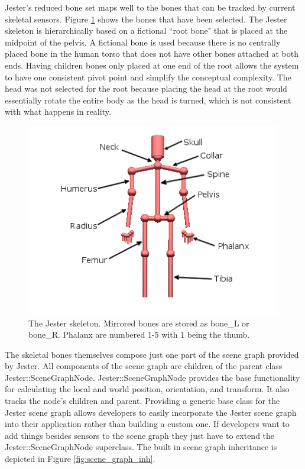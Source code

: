 Jester's reduced bone set maps well to the bones that can be tracked by current skeletal sensors. Figure \ref{fig:skeleton} shows the bones that have been selected. The Jester skeleton is hierarchically based on a fictional ``root bone" that is placed at the midpoint of the pelvis. A fictional bone is used because there is no centrally placed bone in the human torso that does not have other bones attached at both ends. Having children bones only placed at one end of the root allows the system to have one consistent pivot point and simplify the conceptual complexity. The head was not selected for the root because placing the head at the root would essentially rotate the entire body as the head is turned, which is not consistent with what happens in reality.

\begin{figure}[]
\centering
\includegraphics[width=.75\textwidth]{figures/boneLabels}
\caption{The Jester skeleton. Mirrored bones are stored as bone\_L or bone\_R. Phalanx are numbered 1-5 with 1 being the thumb.}
\label{fig:skeleton}
\end{figure}

The skeletal bones themselves compose just one part of the scene graph provided by Jester. All components of the scene graph are children of the parent class \mbox{Jester::SceneGraphNode}. \mbox{Jester::SceneGraphNode} provides the base functionality for calculating the local and world position, orientation, and transform. It also tracks the node's children and parent. Providing a generic base class for the Jester scene graph allows developers to easily incorporate the Jester scene graph into their application rather than building a custom one. If developers want to add things besides sensors to the scene graph they just have to extend the \mbox{Jester::SceneGraphNode} superclass. The built in scene graph inheritance is depicted in Figure \ref{fig:scene_graph_inh}.

